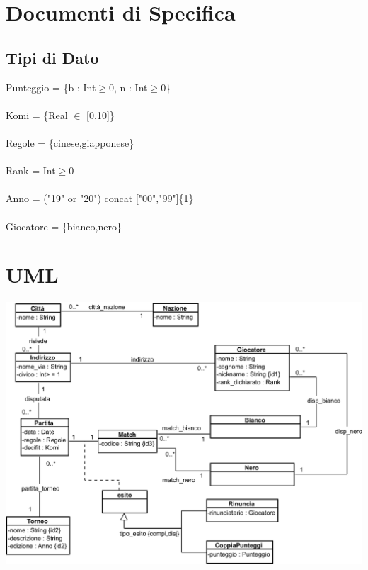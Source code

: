 \documentclass[12pt, letterpaper]{article}
\newcommand{\acc}{\\\hphantom{}\\}
\begin{document}
\section{Documenti di Specifica}
\subsection{Tipi di Dato}
Punteggio = \{b : Int$\ge$0, n : Int$\ge$0\}\acc 
Komi = \{Real $\in$ [0,10]\}\acc 
Regole = \{cinese,giapponese\}\acc
Rank = Int$\ge$0\acc 
Anno = ("19" or "20") concat ["00","99"]\{1\}\acc
Giocatore = \{bianco,nero\}
\section{UML}
\begin{center}
    \includegraphics[width=\textwidth]{images/VPP.png}
\end{center}
\end{document}
